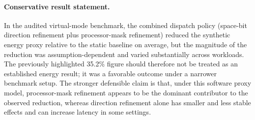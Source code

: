 \paragraph{Conservative result statement.}
In the audited virtual-mode benchmark, the combined dispatch policy (space-bit direction refinement plus processor-mask refinement) reduced the synthetic energy proxy relative to the static baseline on average, but the magnitude of the reduction was assumption-dependent and varied substantially across workloads. The previously highlighted 35.2\% figure should therefore not be treated as an established energy result; it was a favorable outcome under a narrower benchmark setup. The stronger defensible claim is that, under this software proxy model, processor-mask refinement appears to be the dominant contributor to the observed reduction, whereas direction refinement alone has smaller and less stable effects and can increase latency in some settings.
